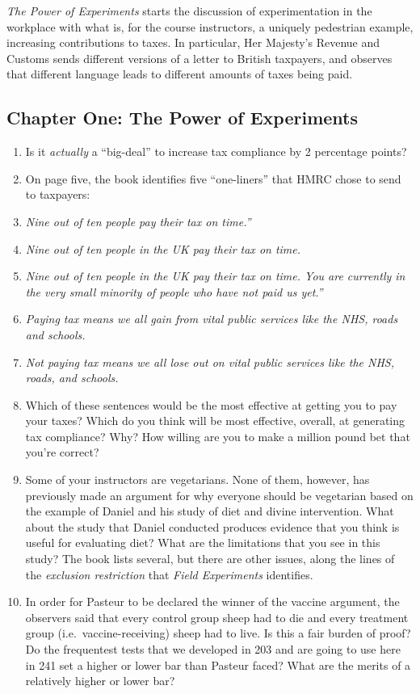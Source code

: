\documentclass[
]{book}
\providecommand{\tightlist}{%
  \setlength{\itemsep}{0pt}\setlength{\parskip}{0pt}}
\begin{document}
\emph{The Power of Experiments} starts the discussion of experimentation
in the workplace with what is, for the course instructors, a uniquely
pedestrian example, increasing contributions to taxes. In particular,
Her Majesty's Revenue and Customs sends different versions of a letter
to British taxpayers, and observes that different language leads to
different amounts of taxes being paid.

\hypertarget{chapter-one-the-power-of-experiments}{%
\subsection{Chapter One: The Power of
Experiments}\label{chapter-one-the-power-of-experiments}}

\begin{enumerate}
\def\labelenumi{\arabic{enumi}.}
\tightlist
\item
  Is it \emph{actually} a ``big-deal'' to increase tax compliance by 2
  percentage points?
\item
  On page five, the book identifies five ``one-liners'' that HMRC chose
  to send to taxpayers:
\item
  \emph{Nine out of ten people pay their tax on time.''}
\item
  \emph{Nine out of ten people in the UK pay their tax on time.}
\item
  \emph{Nine out of ten people in the UK pay their tax on time. You are
  currently in the very small minority of people who have not paid us
  yet.''}
\item
  \emph{Paying tax means we all gain from vital public services like the
  NHS, roads and schools.}
\item
  \emph{Not paying tax means we all lose out on vital public services
  like the NHS, roads, and schools.}
\item
  Which of these sentences would be the most effective at getting you to
  pay your taxes? Which do you think will be most effective, overall, at
  generating tax compliance? Why? How willing are you to make a million
  pound bet that you're correct?
\item
  Some of your instructors are vegetarians. None of them, however, has
  previously made an argument for why everyone should be vegetarian
  based on the example of Daniel and his study of diet and divine
  intervention. What about the study that Daniel conducted produces
  evidence that you think is useful for evaluating diet? What are the
  limitations that you see in this study? The book lists several, but
  there are other issues, along the lines of the \emph{exclusion
  restriction} that \emph{Field Experiments} identifies.
\item
  In order for Pasteur to be declared the winner of the vaccine
  argument, the observers said that every control group sheep had to die
  and every treatment group (i.e.~vaccine-receiving) sheep had to live.
  Is this a fair burden of proof? Do the frequentest tests that we
  developed in 203 and are going to use here in 241 set a higher or
  lower bar than Pasteur faced? What are the merits of a relatively
  higher or lower bar?
\end{enumerate}
\end{document}
